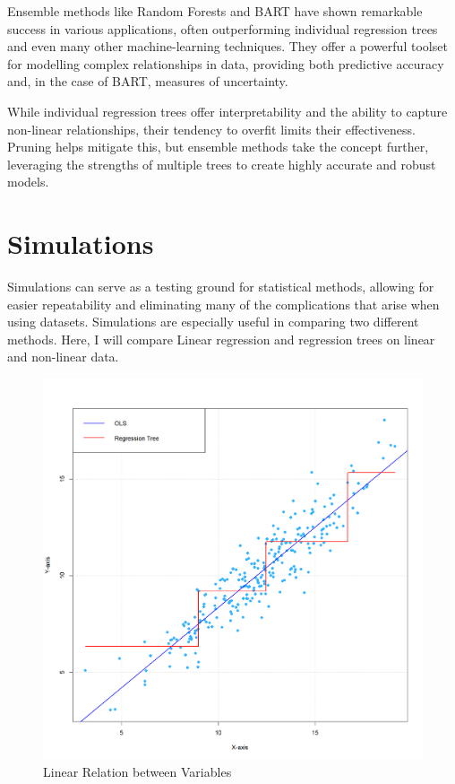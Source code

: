\documentclass[12pt]{article}
\begin{document}
Ensemble methods like Random Forests and BART have shown remarkable success in various applications, often outperforming individual regression trees and even many other machine-learning techniques. They offer a powerful toolset for modelling complex relationships in data, providing both predictive accuracy and, in the case of BART, measures of uncertainty.

While individual regression trees offer interpretability and the ability to capture non-linear relationships, their tendency to overfit limits their effectiveness. Pruning helps mitigate this, but ensemble methods take the concept further, leveraging the strengths of multiple trees to create highly accurate and robust models.


\section{Simulations}

Simulations can serve as a testing ground for statistical methods, allowing for easier repeatability and eliminating many of the complications that arise when using datasets. Simulations are especially useful in comparing two different methods. Here, I will compare Linear regression and regression trees on linear and non-linear data.

\begin{figure}
    \centering
    \includegraphics[scale=0.25]{OLS vs Tree.png}
    \caption{Linear Relation between Variables}
\end{figure}
\end{document}
